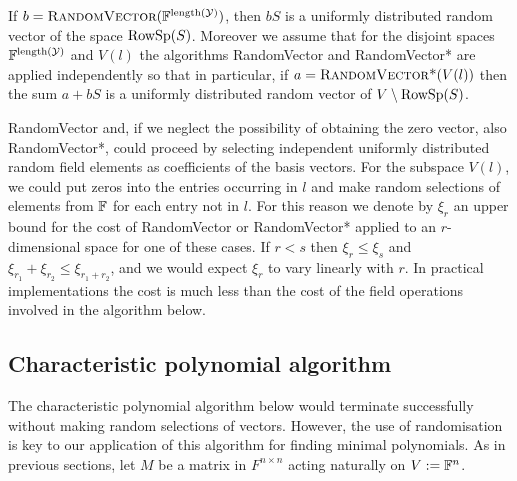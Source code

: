 If $b=\mbox{\sc RandomVector}(\mathbb{F}^{\mathrm{length}(\mathcal{Y})})$, then $bS$ is a
uniformly distributed random vector of the space $\mathrm{RowSp}(S)$. 
Moreover we assume that for the disjoint spaces 
$\mathbb{F}^{\mathrm{length}(\mathcal{Y})}$ and $V(l)$ the 
algorithms {\sc RandomVector} and {\sc RandomVector*} are applied 
independently so that in particular, 
if $a=\mbox{\sc Random\-Vector*}(V(l))$ 
then the sum 
$a + bS$ is a uniformly distributed random vector of $V\setminus \mathrm{RowSp}(S)$. 

{\sc RandomVector} and, if we neglect the possibility of obtaining
the zero vector, also {\sc RandomVector*}, could proceed by selecting
independent uniformly distributed random field elements as coefficients
of the basis vectors. For the subspace $V(l)$, we could put zeros into
the entries occurring in $l$ and make random selections of elements from
$\mathbb{F}$ for each entry not in $l$.
For this reason we denote by $\xi_{r}$ an upper bound 
for the cost of {\sc RandomVector} or {\sc RandomVector*} applied to an 
$r$-dimensional space for one of these cases.
If $r<s$ then $\xi_r\leq\xi_s$ and $\xi_{r_1}+\xi_{r_2} \leq \xi_{r_1+r_2}$, and we would 
expect $\xi_r$ to vary linearly with $r$. In 
practical implementations the cost is much less than the cost of the field operations involved 
in the algorithm below.


\subsection{Characteristic polynomial algorithm}


The characteristic polynomial algorithm below would terminate successfully without 
making random selections of vectors. However, the use of 
randomisation is key to our application of this algorithm for finding minimal polynomials. 
As in previous sections, let $M$ be a matrix in $F^{n \times n}$ 
acting naturally on $V := \mathbb{F}^n$. 





